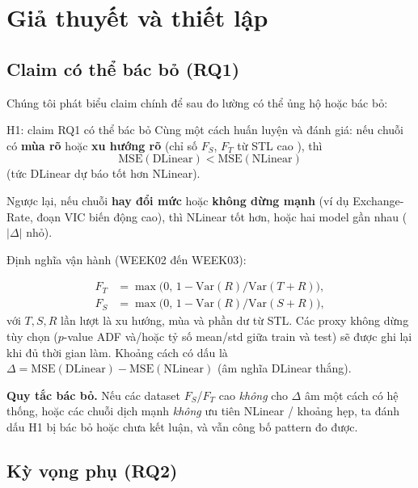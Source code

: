 \section{Giả thuyết và thiết lập}
\label{sec:hypothesis}

\subsection{Claim có thể bác bỏ (RQ1)}

Chúng tôi phát biểu claim chính để sau đo lường có thể ủng hộ hoặc bác bỏ:

\begin{examplebox}{H1: claim RQ1 có thể bác bỏ}
      Cùng một cách huấn luyện và đánh giá: nếu chuỗi có \textbf{mùa rõ} hoặc \textbf{xu hướng rõ}
      (chỉ số \(F_S\), \(F_T\) từ STL cao \cite{cleveland1990stl,hyndman2021fpp3}), thì
      \[
            \mathrm{MSE}(\mathrm{DLinear}) < \mathrm{MSE}(\mathrm{NLinear})
      \]
      (tức DLinear dự báo tốt hơn NLinear).

      Ngược lại, nếu chuỗi \textbf{hay đổi mức} hoặc \textbf{không dừng mạnh}
      (ví dụ Exchange-Rate, đoạn VIC biến động cao), thì NLinear tốt hơn, hoặc hai model gần nhau
      (\(\lvert\Delta\rvert\) nhỏ).
\end{examplebox}

Định nghĩa vận hành (WEEK02 đến WEEK03):

\begin{align*}
      F_T & = \max\!\bigl(0,\, 1 - \mathrm{Var}(R)/\mathrm{Var}(T+R)\bigr), \\
      F_S & = \max\!\bigl(0,\, 1 - \mathrm{Var}(R)/\mathrm{Var}(S+R)\bigr),
\end{align*}
với \(T,S,R\) lần lượt là xu hướng, mùa và phần dư từ STL. Các proxy không dừng tùy chọn
(\(p\)-value ADF và/hoặc tỷ số mean/std giữa train và test) sẽ được ghi lại khi đủ thời gian làm.
Khoảng cách có dấu là
\(\Delta = \mathrm{MSE}(\mathrm{DLinear}) - \mathrm{MSE}(\mathrm{NLinear})\)
(âm nghĩa DLinear thắng).

\textbf{Quy tắc bác bỏ.}
Nếu các dataset \(F_S\)/\(F_T\) cao \emph{không} cho \(\Delta\) âm một cách có hệ thống,
hoặc các chuỗi dịch mạnh \emph{không} ưu tiên NLinear / khoảng hẹp, ta đánh dấu H1
bị bác bỏ hoặc chưa kết luận, và vẫn công bố pattern đo được.

\subsection{Kỳ vọng phụ (RQ2)}

